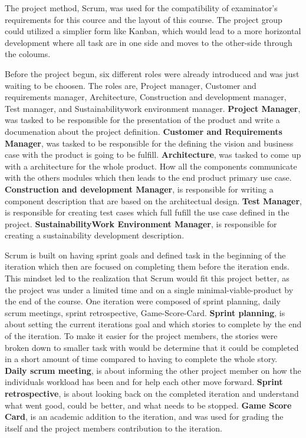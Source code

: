The project method, Scrum, was used for the compatibility of examinator's requirements for this cource and the layout of this course.
The project group could utilized a simplier form like Kanban\cite{atlassianKanban}, which would lead to a more horizontal development where all task are in one side and moves to the other-side through the coloums.


Before the project begun, six different roles were already introduced and was just waiting to be choosen.
The roles are, Project manager, Customer and requirements manager, Architecture, Construction and development manager, Test manager, and Sustainability\/work environment manager.
\textbf{Project Manager}, was tasked to be responsible for the presentation of the product and write a documenation about the project definition.
\textbf{Customer and Requirements Manager}, was tasked to be responsible for the defining the vision and business case with the product is going to be fulfill.
\textbf{Architecture}, was tasked to come up with a architecture for the whole product. 
How all the components communicate with the others modules which then leads to the end product primary use case.
\textbf{Construction and development Manager}, is responsible for writing a component description that are based on the architectual design.
\textbf{Test Manager}, is responsible for creating test cases which full fufill the use case defined in the project.
\textbf{Sustainability\/Work Environment Manager}, is responsible for creating a sustainability development description.


Scrum is built on having sprint goals and defined task in the beginning of the iteration which then are focused on completing them before the iteration ends.
This mindset led to the realization that Scrum would fit this project better, as the project was under a limited time and on a single minimal-viable-product by the end of the course.
One iteration were composed of sprint planning, daily scrum meetings, sprint retrospective, Game-Score-Card.
\textbf{Sprint planning}, is about setting the current iterations goal and which stories to complete by the end of the iteration. 
To make it easier for the project members, the stories were broken down to smaller task with would be determine that it could be completed in a short amount of time compared to having to complete the whole story.
\textbf{Daily scrum meeting}, is about informing the other project member on how the individuals workload has been and for help each other move forward.
\textbf{Sprint retrospective}, is about looking back on the completed iteration and understand what went good, could be better, and what needs to be stopped.
\textbf{Game Score Card}, is an academic addition to the iteration, and was used for grading the itself and the project members contribution to the iteration.